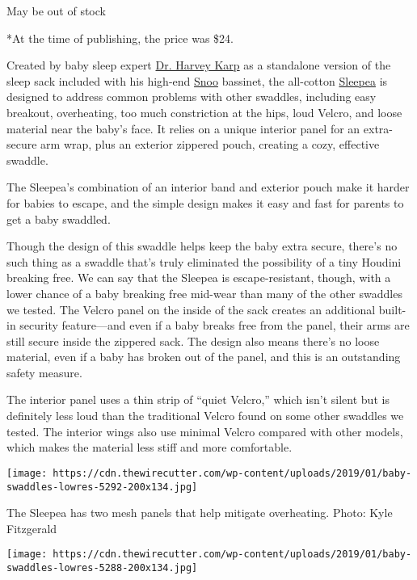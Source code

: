 May be out of stock

*At the time of publishing, the price was \$24.

Created by baby sleep expert
\href{https://www.nytimes3xbfgragh.onion/2018/04/18/magazine/harvey-karp-baby-mogul.html}{Dr.
Harvey Karp} as a standalone version of the sleep sack included with his
high-end
\href{https://www.nytimes3xbfgragh.onion/wirecutter/reviews/best-co-sleepers/\#what-about-the-snoo}{Snoo}
bassinet, the all-cotton
\href{https://www.nytimes3xbfgragh.onion/wirecutter/out/link/30686/162165/4/86635/?merchant=BuyBuy\%20Baby}{Sleepea}
is designed to address common problems with other swaddles, including
easy breakout, overheating, too much constriction at the hips, loud
Velcro, and loose material near the baby's face. It relies on a unique
interior panel for an extra-secure arm wrap, plus an exterior zippered
pouch, creating a cozy, effective swaddle.

The Sleepea's combination of an interior band and exterior pouch make it
harder for babies to escape, and the simple design makes it easy and
fast for parents to get a baby swaddled.

Though the design of this swaddle helps keep the baby extra secure,
there's no such thing as a swaddle that's truly eliminated the
possibility of a tiny Houdini breaking free. We can say that the Sleepea
is escape-resistant, though, with a lower chance of a baby breaking free
mid-wear than many of the other swaddles we tested. The Velcro panel on
the inside of the sack creates an additional built-in security
feature---and even if a baby breaks free from the panel, their arms are
still secure inside the zippered sack. The design also means there's no
loose material, even if a baby has broken out of the panel, and this is
an outstanding safety measure.

The interior panel uses a thin strip of ``quiet Velcro,'' which isn't
silent but is definitely less loud than the traditional Velcro found on
some other swaddles we tested. The interior wings also use minimal
Velcro compared with other models, which makes the material less stiff
and more comfortable.

\texttt{[image: https://cdn.thewirecutter.com/wp-content/uploads/2019/01/baby-swaddles-lowres-5292-200x134.jpg]}

The Sleepea has two mesh panels that help mitigate overheating. Photo:
Kyle Fitzgerald

\texttt{[image: https://cdn.thewirecutter.com/wp-content/uploads/2019/01/baby-swaddles-lowres-5288-200x134.jpg]}

